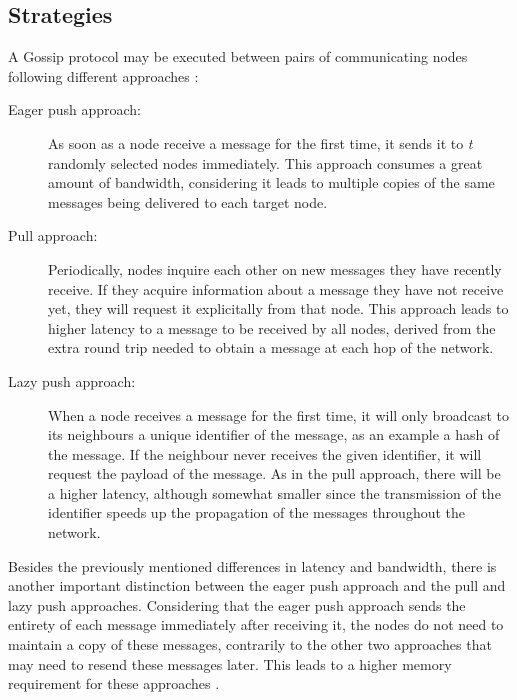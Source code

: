 \subsection{Strategies}
\label{subsec:gossip_strategies}
A Gossip protocol may be executed between pairs of communicating nodes following different
approaches \cite{Karp2000}:
\begin{description}
      \item[Eager push approach:] As soon as a node receive a message for the first time, it
            sends it to \textit{t} randomly selected nodes immediately. This approach consumes
            a great amount of bandwidth, considering it leads to multiple copies of the same
            messages being delivered to each target node.
      \item[Pull approach:] Periodically, nodes inquire each other on new messages they have
            recently receive. If they acquire information about a message they have not
            receive yet, they will request it explicitally from that node. This approach
            leads to higher latency to a message to be received by all nodes, derived from the
            extra round trip needed to obtain a message at each hop of the network.
      \item[Lazy push approach:] When a node receives a message for the first time, it will
            only broadcast to its neighbours a unique identifier of the message, as an example
            a hash of the message. If the neighbour never receives the given identifier, it will
            request the payload of the message. As in the pull approach, there will be a higher
            latency, although somewhat smaller since the transmission of the identifier speeds
            up the propagation of the messages throughout the network.
\end{description}

Besides the previously mentioned differences in latency and bandwidth, there is another
important distinction between the eager push approach and the pull and lazy push approaches.
Considering that the eager push approach sends the entirety of each message immediately after
receiving it, the nodes do not need to maintain a copy of these messages, contrarily to the
other two approaches that may need to resend these messages later. This leads to a higher
memory requirement for these approaches \cite{Leitao2012}.

